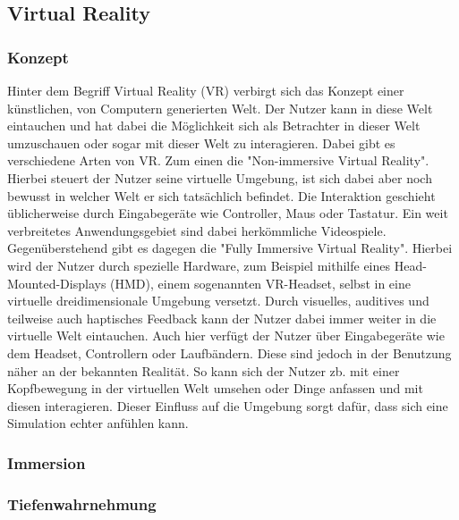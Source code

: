 \subsection{Virtual Reality}
\subsubsection{Konzept}

Hinter dem Begriff Virtual Reality (VR) verbirgt sich das Konzept einer
künstlichen, von Computern generierten Welt. Der Nutzer kann in diese Welt
eintauchen und hat dabei die Möglichkeit sich als Betrachter in dieser Welt
umzuschauen oder sogar mit dieser Welt zu interagieren.
Dabei gibt es verschiedene Arten von VR. Zum einen die "Non-immersive Virtual Reality".
Hierbei steuert der Nutzer seine virtuelle Umgebung, ist sich dabei aber noch bewusst
in welcher Welt er sich tatsächlich befindet. Die Interaktion geschieht üblicherweise durch
Eingabegeräte wie Controller, Maus oder Tastatur. Ein weit verbreitetes Anwendungsgebiet sind
dabei herkömmliche Videospiele.
Gegenüberstehend gibt es dagegen die "Fully Immersive Virtual Reality". Hierbei wird der Nutzer durch
spezielle Hardware, zum Beispiel mithilfe eines Head-Mounted-Displays (HMD), einem sogenannten VR-Headset,
selbst in eine virtuelle dreidimensionale Umgebung versetzt.
Durch visuelles, auditives und teilweise auch haptisches Feedback kann der Nutzer dabei immer weiter
in die virtuelle Welt eintauchen.
Auch hier verfügt der Nutzer über Eingabegeräte wie dem Headset, Controllern oder Laufbändern. Diese sind
jedoch in der Benutzung näher an der bekannten Realität. So kann sich der Nutzer zb. mit einer Kopfbewegung
in der virtuellen Welt umsehen oder Dinge anfassen und mit diesen interagieren. Dieser Einfluss auf die
Umgebung sorgt dafür, dass sich eine Simulation echter anfühlen kann.


\subsubsection{Immersion}
\subsubsection{Tiefenwahrnehmung}



